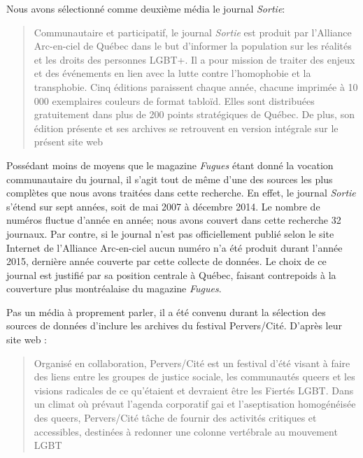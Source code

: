 

Nous avons sélectionné comme deuxième média le journal \emph{Sortie}:
\blockquote[{\cite{AllianceArc2014}}][.]{ Communautaire et participatif, le journal \emph{Sortie} est produit par l’Alliance Arc-en-ciel de Québec dans le but d’informer la population sur les réalités et les droits des personnes LGBT+.
 Il a pour mission de traiter des enjeux et des événements en lien avec la lutte contre l’homophobie et la transphobie.
 Cinq éditions paraissent chaque année, chacune imprimée à 10 000 exemplaires couleurs de format tabloïd.
 Elles sont distribuées gratuitement dans plus de 200 points stratégiques de Québec.
De plus, son édition présente et ses archives se retrouvent en version intégrale sur le présent site web}
Possédant moins de moyens que le magazine \emph{Fugues} étant donné la vocation communautaire du journal, il s'agit tout de même d'une des sources les plus complètes que nous avons traitées dans cette recherche.
En effet, le journal \emph{Sortie} s'étend sur sept années, soit de mai 2007 à décembre 2014.
Le nombre de numéros fluctue d'année en année; nous avons couvert dans cette recherche 32 journaux.
Par contre, si le journal n'est pas officiellement publié selon le site Internet de l'Alliance Arc-en-ciel aucun numéro n'a été produit durant l'année 2015, dernière année couverte par cette collecte de données.
Le choix de ce journal est justifié par sa position centrale à Québec, faisant contrepoids à la couverture plus montréalaise du magazine \emph{Fugues}.

Pas un média à proprement parler, il a été convenu durant la sélection des sources de données d'inclure les archives du festival Pervers/Cité.
D'après leur site web :
\blockquote[{\cite{Pervers/Cite2015}}][.]{Organisé en collaboration, Pervers/Cité est un festival d’été visant à faire des liens entre les groupes de justice sociale, les communautés queers et les visions radicales de ce qu'étaient et devraient être les Fiertés LGBT\@.
Dans un climat où prévaut l’agenda corporatif gai et l’aseptisation homogénéisée des queers, Pervers/Cité tâche de fournir des activités critiques et accessibles, destinées à redonner une colonne vertébrale au mouvement LGBT}.

